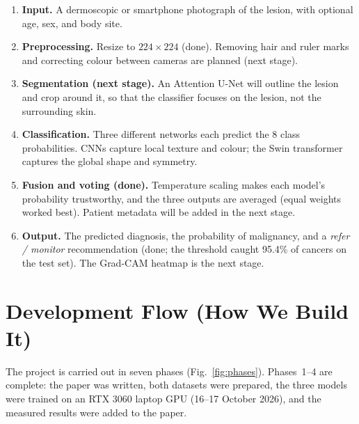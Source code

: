 \documentclass[10pt,a4paper]{article}
\begin{document}
\begin{enumerate}
  \item \textbf{Input.} A dermoscopic or smartphone photograph of the
        lesion, with optional age, sex, and body site.
  \item \textbf{Preprocessing.} Resize to $224\times224$ (done). Removing
        hair and ruler marks and correcting colour between cameras are
        planned (next stage).
  \item \textbf{Segmentation (next stage).} An Attention U-Net will
        outline the lesion and crop around it, so that the classifier
        focuses on the lesion, not the surrounding skin.
  \item \textbf{Classification.} Three different networks each predict
        the 8 class probabilities. CNNs capture local texture and colour;
        the Swin transformer captures the global shape and symmetry.
  \item \textbf{Fusion and voting (done).} Temperature scaling makes each
        model's probability trustworthy, and the three outputs are
        averaged (equal weights worked best). Patient metadata will be
        added in the next stage.
  \item \textbf{Output.} The predicted diagnosis, the probability of
        malignancy, and a \emph{refer / monitor} recommendation (done; the
        threshold caught 95.4\% of cancers on the test set). The Grad-CAM
        heatmap is the next stage.
\end{enumerate}

\section{Development Flow (How We Build It)}
The project is carried out in seven phases (Fig.~\ref{fig:phases}).
Phases~1--4 are complete: the paper was written, both datasets were
prepared, the three models were trained on an RTX 3060 laptop GPU
(16--17 October 2026), and the measured results were added to the
paper.
\end{document}
